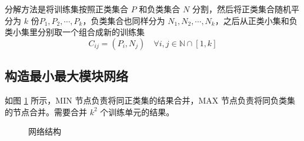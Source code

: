     分解方法是将训练集按照正类集合 $P$ 和负类集合 $N$ 分割，然后将正类集合随机平分为 $k$ 份$P_1,P_2,\cdots,P_k$，负类集合也同样分为 $N_1,N_2,\cdots,N_k$，之后从正类小集和负类小集里分别取一个组合成新的训练集
    \begin{equation*}
        C_{ij} = (P_i, N_j)\quad \forall i,j\in\mathbb{N}\cap[1,k]
    \end{equation*}

    \subsection{构造最小最大模块网络}


    如图 \ref{fig:minmax} 所示，MIN 节点负责将同正类集的结果合并，MAX 节点负责将同负类集的节点合并。需要合并 $k^2$ 个训练单元的结果。

    \begin{figure}[H]
        \centering
        
        \caption{网络结构}\label{fig:minmax}
    \end{figure}

    

    
